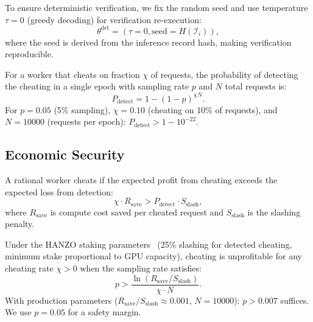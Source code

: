 To ensure deterministic verification, we fix the random seed and use
temperature $\tau = 0$ (greedy decoding) for verification re-execution:
\begin{equation}
\theta^{\text{det}} = (\tau = 0, \text{seed} = H(\mathcal{I}_i)),
\end{equation}
where the seed is derived from the inference record hash, making verification
reproducible.

\begin{theorem}
For a worker that cheats on fraction $\chi$ of requests, the probability of
detecting the cheating in a single epoch with sampling rate $p$ and $N$ total
requests is:
\begin{equation}
P_{\text{detect}} = 1 - (1 - p)^{\chi N}.
\end{equation}
For $p = 0.05$ (5\% sampling), $\chi = 0.10$ (cheating on 10\% of requests),
and $N = 10000$ (requests per epoch): $P_{\text{detect}} > 1 - 10^{-22}$.
\end{theorem}

\subsection{Economic Security}

\begin{definition}
A rational worker cheats if the expected profit from cheating exceeds the
expected loss from detection:
\begin{equation}
\chi \cdot R_{\text{save}} > P_{\text{detect}} \cdot S_{\text{slash}},
\end{equation}
where $R_{\text{save}}$ is compute cost saved per cheated request and
$S_{\text{slash}}$ is the slashing penalty.
\end{definition}

\begin{theorem}
Under the HANZO staking parameters~\cite{hanzotokenomics} (25\% slashing for
detected cheating, minimum stake proportional to GPU capacity), cheating is
unprofitable for any cheating rate $\chi > 0$ when the sampling rate satisfies:
\begin{equation}
p > \frac{\ln(R_{\text{save}} / S_{\text{slash}})}{\chi \cdot N}.
\end{equation}
With production parameters ($R_{\text{save}} / S_{\text{slash}} \approx 0.001$,
$N = 10000$): $p > 0.007$ suffices. We use $p = 0.05$ for a safety margin.
\end{theorem}

